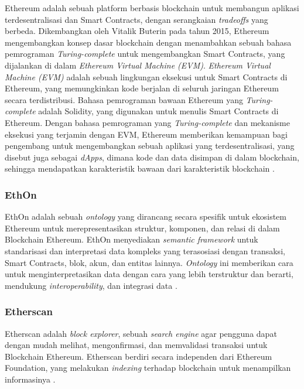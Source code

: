 Ethereum adalah sebuah platform berbasis blockchain untuk membangun aplikasi terdesentralisasi dan Smart Contracts, dengan serangkaian \textit{tradeoffs} yang berbeda. Dikembangkan oleh Vitalik Buterin pada tahun 2015, Ethereum mengembangkan konsep dasar blockchain dengan menambahkan sebuah bahasa pemrograman \textit{Turing-complete} untuk mengembangkan Smart Contracts, yang dijalankan di dalam \textit{Ethereum Virtual Machine (EVM)}. \textit{Ethereum Virtual Machine (EVM)} adalah sebuah lingkungan eksekusi untuk Smart Contracts di Ethereum, yang memungkinkan kode berjalan di seluruh jaringan Ethereum secara terdistribusi. Bahasa pemrograman bawaan Ethereum yang \textit{Turing-complete} adalah Solidity, yang digunakan untuk menulis Smart Contracts di Ethereum.  Dengan bahasa pemrograman yang \textit{Turing-complete} dan mekanisme eksekusi yang terjamin dengan EVM, Ethereum memberikan kemampuan bagi pengembang untuk mengembangkan sebuah aplikasi yang terdesentralisasi, yang disebut juga sebagai \textit{dApps}, dimana kode dan data disimpan di dalam blockchain, sehingga mendapatkan karakteristik bawaan dari karakteristik blockchain \parencite{buterin2013ethereum}.

\subsubsection{EthOn}
\label{subsubsec:ethon}

EthOn adalah sebuah \textit{ontology} yang dirancang secara spesifik untuk ekosistem Ethereum untuk merepresentasikan struktur, komponen, dan relasi di dalam Blockchain Ethereum. EthOn menyediakan \textit{semantic framework} untuk standarisasi dan interpretasi data kompleks yang terasosiasi dengan transaksi, Smart Contracts, blok, akun, dan entitas lainnya. \textit{Ontology} ini memberikan cara untuk menginterpretasikan data dengan cara yang lebih terstruktur dan berarti, mendukung \textit{interoperability}, dan integrasi data \parencite{pfeffer2016ethon}.

\subsubsection{Etherscan}
\label{subsubsec:etherscan}

Etherscan adalah \textit{block explorer}, sebuah \textit{search engine} agar pengguna dapat dengan mudah melihat, mengonfirmasi, dan memvalidasi transaksi untuk Blockchain Ethereum. Etherscan berdiri secara independen dari Ethereum Foundation, yang melakukan \textit{indexing} terhadap blockchain untuk menampilkan informasinya \parencite{etherscan2024}.

